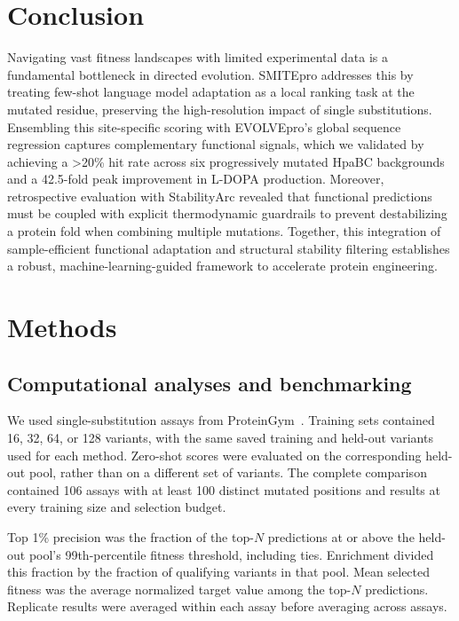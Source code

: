 \documentclass[sn-nature]{sn-jnl}
\begin{document}
\section{Conclusion}

Navigating vast fitness landscapes with limited experimental data is a fundamental bottleneck in directed evolution. SMITEpro addresses this by treating few-shot language model adaptation as a local ranking task at the mutated residue, preserving the high-resolution impact of single substitutions. Ensembling this site-specific scoring with EVOLVEpro's global sequence regression captures complementary functional signals, which we validated by achieving a >20\% hit rate across six progressively mutated HpaBC backgrounds and a 42.5-fold peak improvement in L-DOPA production. Moreover, retrospective evaluation with StabilityArc revealed that functional predictions must be coupled with explicit thermodynamic guardrails to prevent destabilizing a protein fold when combining multiple mutations. Together, this integration of sample-efficient functional adaptation and structural stability filtering establishes a robust, machine-learning-guided framework to accelerate protein engineering.
    
\section{Methods}

    \subsection{Computational analyses and benchmarking}
    We used single-substitution assays from ProteinGym~\cite{notin2023proteingym}. Training sets contained 16, 32, 64, or 128 variants, with the same saved training and held-out variants used for each method. Zero-shot scores were evaluated on the corresponding held-out pool, rather than on a different set of variants. The complete comparison contained 106 assays with at least 100 distinct mutated positions and results at every training size and selection budget.

    Top 1\% precision was the fraction of the top-$N$ predictions at or above the held-out pool's 99th-percentile fitness threshold, including ties. Enrichment divided this fraction by the fraction of qualifying variants in that pool. Mean selected fitness was the average normalized target value among the top-$N$ predictions. Replicate results were averaged within each assay before averaging across assays.
\end{document}
